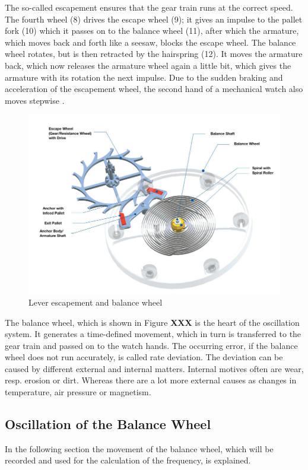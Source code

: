 \documentclass[12pt, a4paper]{report}
\begin{document}
The so-called escapement ensures that the gear train runs at the correct speed. The fourth wheel (8) drives the escape wheel (9); it gives an impulse to the pallet fork (10) which it passes on to the balance wheel (11), after which the armature, which moves back and forth like a seesaw, blocks the escape wheel. The balance wheel rotates, but is then retracted by the hairspring (12). It moves the armature back, which now releases the armature wheel again a little bit, which gives the armature with its rotation the next impulse. Due to the sudden braking and acceleration of the escapement wheel, the second hand of a mechanical watch also moves stepwise \cite{Uhrwerk}.
    \newline
    \noindent
    \begin{figure}[H]
    \centering
    \includegraphics[scale=0.45]{Images/Hemmung-Teil1.jpg}
    
    \caption{Lever escapement and balance wheel \cite{Uhrwerk}}
    \end{figure}
\bigskip
The balance wheel, which is shown in Figure \textbf{XXX} is the heart of the oscillation system. It generates a time-defined movement, which in turn is transferred to the gear train and passed on to the watch hands. 
The occurring error, if the balance wheel does not run accurately, is called rate deviation. The deviation can be caused by different external and internal matters. Internal motives often are wear, resp. erosion or dirt. Whereas there are a lot more external causes as changes in temperature, air pressure or magnetism.

\subsection{Oscillation of the Balance Wheel}
In the following section the movement of the balance wheel, which will be recorded and used for the calculation of the frequency, is explained.
\end{document}
